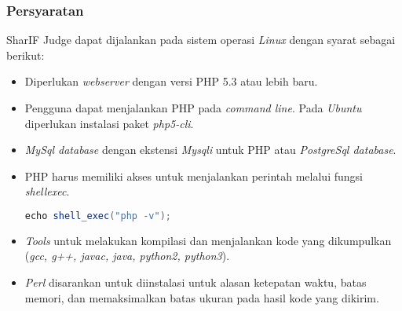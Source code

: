 \subsubsection{Persyaratan}
\label{subsubsec:persyaratan}
SharIF Judge dapat dijalankan pada sistem operasi \textit{Linux} dengan syarat sebagai berikut:
\begin{itemize}
\item Diperlukan \textit{webserver} dengan versi PHP 5.3 atau lebih baru.
\item Pengguna dapat menjalankan PHP pada \textit{command line}. Pada \textit{Ubuntu} diperlukan instalasi paket \textit{php5-cli}.
\item \textit{MySql database} dengan ekstensi \textit{Mysqli} untuk PHP atau \textit{PostgreSql database}.
\item PHP harus memiliki akses untuk menjalankan perintah melalui fungsi \textit{shell\textunderscore exec}.

\begin{lstlisting}[language=Java, caption=Kode untuk melakukah pengetesan fungsi, label=kode:shell]
	echo shell_exec("php -v");
\end{lstlisting}

\item \textit{Tools} untuk melakukan kompilasi dan menjalankan kode yang dikumpulkan (\textit{gcc, g++, javac, java, python2, python3}).
\item \textit{Perl} disarankan untuk diinstalasi untuk alasan ketepatan waktu, batas memori, dan memaksimalkan batas ukuran pada hasil kode yang dikirim.
\end{itemize}

